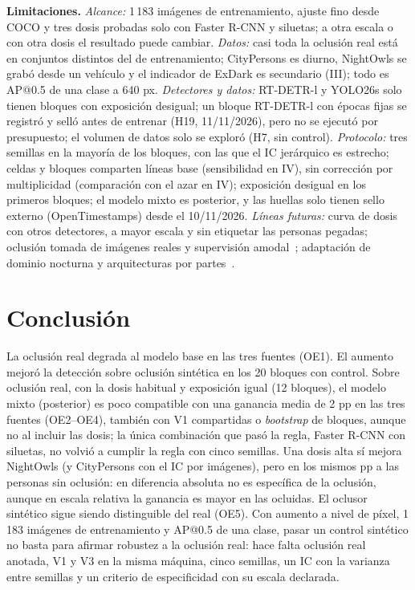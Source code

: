 \documentclass[conference]{IEEEtran}
\begin{document}
\textbf{Limitaciones.} \emph{Alcance:} 1\,183 imágenes de entrenamiento, ajuste fino desde COCO y tres dosis probadas solo con Faster R-CNN y siluetas; a otra escala o con otra dosis el resultado puede cambiar. \emph{Datos:} casi toda la oclusión real está en conjuntos distintos del de entrenamiento; CityPersons es diurno, NightOwls se grabó desde un vehículo y el indicador de ExDark es secundario (III); todo es AP@0.5 de una clase a 640 px. \emph{Detectores y datos:} RT-DETR-l y YOLO26s solo tienen bloques con exposición desigual; un bloque RT-DETR-l con épocas fijas se registró y selló antes de entrenar (H19, 11/11/2026), pero no se ejecutó por presupuesto; el volumen de datos solo se exploró (H7, sin control). \emph{Protocolo:} tres semillas en la mayoría de los bloques, con las que el IC jerárquico es estrecho; celdas y bloques comparten líneas base (sensibilidad en IV), sin corrección por multiplicidad (comparación con el azar en IV); exposición desigual en los primeros bloques; el modelo mixto es posterior, y las huellas solo tienen sello externo (OpenTimestamps) desde el 10/11/2026. \emph{Líneas futuras:} curva de dosis con otros detectores, a mayor escala y sin etiquetar las personas pegadas; oclusión tomada de imágenes reales y supervisión amodal~\cite{Reddy2022walt}; adaptación de dominio nocturna y arquitecturas por partes~\cite{Wang2020compnet}.

\section{Conclusión}
La oclusión real degrada al modelo base en las tres fuentes (OE1). El aumento mejoró la detección sobre oclusión sintética en los 20 bloques con control. Sobre oclusión real, con la dosis habitual y exposición igual (12 bloques), el modelo mixto (posterior) es poco compatible con una ganancia media de 2 pp en las tres fuentes (OE2--OE4), también con V1 compartidas o \emph{bootstrap} de bloques, aunque no al incluir las dosis; la única combinación que pasó la regla, Faster R-CNN con siluetas, no volvió a cumplir la regla con cinco semillas. Una dosis alta sí mejora NightOwls (y CityPersons con el IC por imágenes), pero en los mismos pp a las personas sin oclusión: en diferencia absoluta no es específica de la oclusión, aunque en escala relativa la ganancia es mayor en las ocluidas. El oclusor sintético sigue siendo distinguible del real (OE5). Con aumento a nivel de píxel, 1\,183 imágenes de entrenamiento y AP@0.5 de una clase, pasar un control sintético no basta para afirmar robustez a la oclusión real: hace falta oclusión real anotada, V1 y V3 en la misma máquina, cinco semillas, un IC con la varianza entre semillas y un criterio de especificidad con su escala declarada.
\end{document}
